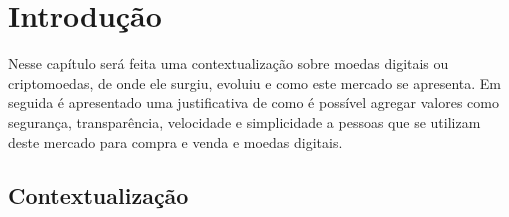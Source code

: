\chapter{Introdução}

Nesse capítulo será feita uma contextualização sobre moedas digitais ou criptomoedas, de onde ele surgiu, evoluiu e como este mercado se apresenta. Em seguida é apresentado uma justificativa de como é possível agregar valores como segurança, transparência, velocidade e simplicidade a pessoas que se utilizam deste mercado para compra e venda e moedas digitais.

\section{Contextualização}





